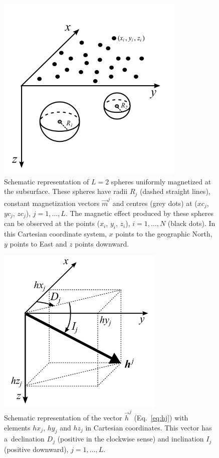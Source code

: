 \documentclass[journal abbreviation, npg]{copernicus}
\begin{document}
\begin{figure}[t]
\includegraphics[width=90mm]{Figures/npgd-2014-0069-f01}
\caption{Schematic representation of $L = 2$ spheres uniformly
  magnetized at the subsurface. These spheres have radii $R_{j}$
  (dashed straight lines), constant magnetization vectors
  $\vec{m}^{j}$ and centres (grey dots) at ($xc_{j}$, $yc_{j}$, $zc_{j}$),
  $j = 1, \ldots, L$. The magnetic effect produced by these spheres
  can be observed at the points ($x_{i}$, $y_{i}$, $z_{i}$), $i = 1,
  \ldots, N$ (black dots). In this Cartesian coordinate system, $x$
  points to the geographic North, $y$ points to East and $z$ points
  downward.}
\label{fig:geometric-aspects}
\end{figure}

\begin{figure}[t]
\includegraphics[width=80mm]{Figures/npgd-2014-0069-f02}
\caption{Schematic representation of the vector $\vec{h}^{j}$
  (Eq.~\ref{eq:hj}) with elements $hx_{j}$, $hy_{j}$ and $hz_{j}$ in
  Cartesian coordinates. This vector has a~declination $D_{j}$
  (positive in the clockwise sense) and inclination $I_{j}$ (positive
  downward), $j = 1, \ldots, L$.}
\label{fig:spherical-coordinates}
\end{figure}
\end{document}
